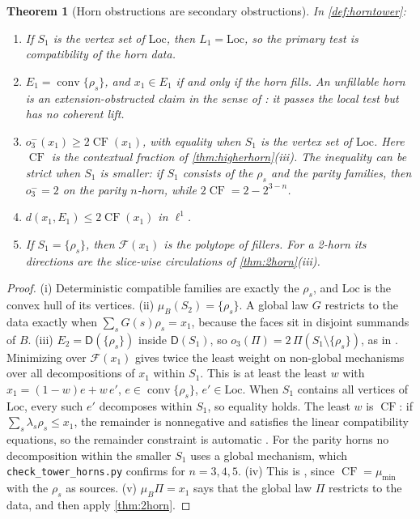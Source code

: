 \documentclass[11pt]{article}
\newtheorem{theorem}{Theorem}[section]
\theoremstyle{definition}
\theoremstyle{remark}
\newcommand{\D}{\mathsf{D}}
\begin{document}
\begin{theorem}[Horn obstructions are secondary obstructions]\label{thm:horntower}
In \cref{def:horntower}:
\begin{enumerate}[label=(\roman*)]
\item If $S_1$ is the vertex set of $\mathrm{Loc}$, then $L_1=\mathrm{Loc}$, so the primary test is compatibility of the horn data.
\item $E_1=\operatorname{conv}\{\rho_s\}$, and $x_1\in E_1$ if and only if the horn fills. An unfillable horn is an extension-obstructed
  claim in the sense of \cite[Def.~10.17]{Awasthi-Tower}: it passes the local test but has no coherent lift.
\item $o_3^-(x_1)\ge2\operatorname{CF}(x_1)$, with equality when $S_1$ is the vertex set of $\mathrm{Loc}$. Here
  $\operatorname{CF}$ is the contextual fraction of \cref{thm:higherhorn}(iii). The inequality can be strict when $S_1$ is
  smaller: if $S_1$ consists of the $\rho_s$ and the parity families, then $o_3^-=2$ on the parity $n$-horn, while
  $2\operatorname{CF}=2-2^{3-n}$.
\item $d(x_1,E_1)\le2\operatorname{CF}(x_1)$ in $\ell^1$.
\item If $S_1=\{\rho_s\}$, then $\mathcal F(x_1)$ is the polytope of fillers. For a 2-horn its directions are the slice-wise
  circulations of \cref{thm:2horn}(iii).
\end{enumerate}
\end{theorem}
\begin{proof}
(i) Deterministic compatible families are exactly the $\rho_s$, and $\mathrm{Loc}$ is the convex hull of its vertices.
(ii) $\mu_B(S_2)=\{\rho_s\}$. A global law $G$ restricts to the data exactly when $\sum_sG(s)\rho_s=x_1$, because the faces sit in
disjoint summands of $B$.
(iii) $E_2=\D(\{\rho_s\})$ inside $\D(S_1)$, so $o_3(\Pi)=2\,\Pi(S_1\setminus\{\rho_s\})$, as in \cite[Prop.~10.9]{Awasthi-Tower}.
Minimizing over $\mathcal F(x_1)$ gives twice the least weight on non-global mechanisms over all decompositions of $x_1$ within
$S_1$. This is at least the least $w$ with $x_1=(1-w)e+w\,e'$, $e\in\operatorname{conv}\{\rho_s\}$, $e'\in\mathrm{Loc}$. When
$S_1$ contains all vertices of $\mathrm{Loc}$, every such $e'$ decomposes within $S_1$, so equality holds. The least $w$ is
$\operatorname{CF}$: if $\sum_s\lambda_s\rho_s\le x_1$, the remainder is nonnegative and satisfies the linear compatibility
equations, so the remainder constraint is automatic \cite{AbramskyBarbosaMansfield2017}. For the parity horns no
decomposition within the smaller $S_1$ uses a global mechanism, which \texttt{check\_tower\_horns.py} confirms for
$n=3,4,5$.
(iv) This is \cite[Prop.~5.12]{Awasthi-Tower}, since $\operatorname{CF}=\mu_{\min}$ with the $\rho_s$ as sources.
(v) $\mu_B\Pi=x_1$ says that the global law $\Pi$ restricts to the data, and then apply \cref{thm:2horn}.
\end{proof}
\end{document}
